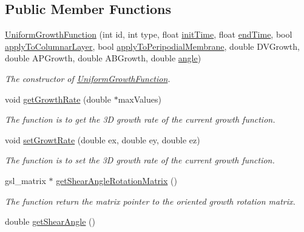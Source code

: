 \subsection*{Public Member Functions}
\begin{DoxyCompactItemize}
\item 
\hyperlink{classUniformGrowthFunction_ab5d7f19747a71d71cec5cc6d55b93a36}{Uniform\+Growth\+Function} (int id, int type, float \hyperlink{classGrowthFunctionBase_ae92513a7b41637df8e26e7db35ddf97c}{init\+Time}, float \hyperlink{classGrowthFunctionBase_a3ff4db0573d354a75666a5f3ca446941}{end\+Time}, bool \hyperlink{classGrowthFunctionBase_a3d56771e7c145589a14e11cc331e0326}{apply\+To\+Columnar\+Layer}, bool \hyperlink{classGrowthFunctionBase_a08ae19f58cb98fa8e315a77f52749732}{apply\+To\+Peripodial\+Membrane}, double D\+V\+Growth, double A\+P\+Growth, double A\+B\+Growth, double \hyperlink{classUniformGrowthFunction_a1a985ff52f9796688e00942b4d3349f8}{angle})
\begin{DoxyCompactList}\small\item\em The constructor of \hyperlink{classUniformGrowthFunction}{Uniform\+Growth\+Function}. \end{DoxyCompactList}\item 
void \hyperlink{classUniformGrowthFunction_ad5be18ae004a3eed205ab3570e13202a}{get\+Growth\+Rate} (double $\ast$max\+Values)
\begin{DoxyCompactList}\small\item\em The function is to get the 3\+D growth rate of the current growth function. \end{DoxyCompactList}\item 
void \hyperlink{classUniformGrowthFunction_aff899907569af697d47927f61b6871a5}{set\+Growt\+Rate} (double ex, double ey, double ez)
\begin{DoxyCompactList}\small\item\em The function is to set the 3\+D growth rate of the current growth function. \end{DoxyCompactList}\item 
\hypertarget{classUniformGrowthFunction_a5a7e9b102a299b94ba648513b66f9cd1}{}gsl\+\_\+matrix $\ast$ \hyperlink{classUniformGrowthFunction_a5a7e9b102a299b94ba648513b66f9cd1}{get\+Shear\+Angle\+Rotation\+Matrix} ()\label{classUniformGrowthFunction_a5a7e9b102a299b94ba648513b66f9cd1}

\begin{DoxyCompactList}\small\item\em The function return the matrix pointer to the oriented growth rotation matrix. \end{DoxyCompactList}\item 
\hypertarget{classUniformGrowthFunction_a8a60d83743c441f7453af8053d5e7010}{}double \hyperlink{classUniformGrowthFunction_a8a60d83743c441f7453af8053d5e7010}{get\+Shear\+Angle} ()\label{classUniformGrowthFunction_a8a60d83743c441f7453af8053d5e7010}


\end{DoxyCompactItemize}
